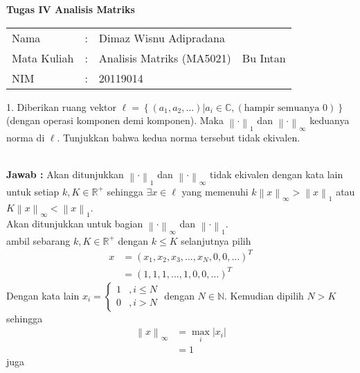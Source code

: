 \documentclass[11pt,a4paper]{article}
\newcommand{\ds}{\displaystyle}
\theoremstyle{plain}
\theoremstyle{definition}
\theoremstyle{remark}
\begin{document}
\begin{enumerate}
\newpage


\begin{center}
	\textbf{Tugas IV Analisis Matriks}
\end{center}


\begin{tabular}{llll}
	Nama        & : & Dimaz Wisnu Adipradana    &          \\
	Mata Kuliah & : & Analisis Matriks (MA5021) & Bu Intan \\
	NIM        & : & 20119014                  &         
\end{tabular}


\begin{enumerate}
	
	\- \\
	\textbf{Jawab :} Akan ditunjukkan $\left\|\cdot\right\|_{1}$ dan $\left\|\cdot\right\|_{\infty}$ tidak ekivalen dengan kata lain untuk setiap $k,K\in \mathbb{R}^{+}$ sehingga $\exists x\in \ell$  yang memenuhi $k\left\| x\right\|_{\infty}>\left\| x\right\|_{1}$ atau $K\left\| x\right\|_{\infty}< \left\| x\right\|_{1}$.\\
	Akan ditunjukkan untuk bagian $\left\| \cdot\right\|_{\infty}$ dan $\left\| \cdot\right\|_{1}$.\\
	ambil sebarang $k,K\in \mathbb{R}^{+}$ dengan $k\leq K$ selanjutnya pilih 
	\begin{align*}
	x &= \left( x_{1},x_{2},x_{3},\ldots,x_{N},0,0,\ldots\right)^{T} \\
	&= \left( 1,1,1,\ldots,1,0,0,\ldots\right)^{T}
	\end{align*}
	Dengan kata lain $x_{i}= \begin{cases}
	1 &,  i\leq N\\
	0 &,  i>N
	\end{cases}$ dengan $N\in \mathbb{N}$. Kemudian dipilih $N>K$ sehingga
	\begin{align*}
	\left\| x\right\|_{\infty} &=\ds \max_{i} \left| x_{i}\right| \\
	&= 1
	\end{align*} juga

\end{enumerate}
\end{enumerate}
\end{document}
